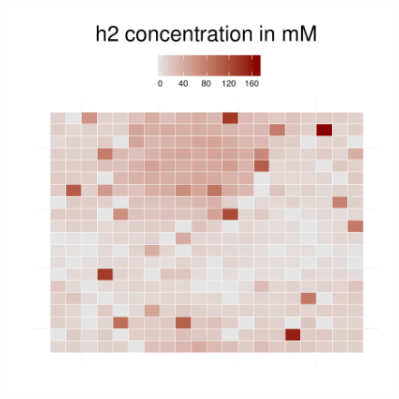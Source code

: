 \begin{figure}[h]
{\begin{minipage}[t]{0.3\textwidth}
  \end{minipage}
  \begin{minipage}[t]{0.3\textwidth}
    \includegraphics[width=\textwidth]{../results/barkeri_beijerinckii_20x20_seed6764_h2150.pdf}
  \end{minipage}
  }
\end{figure}
